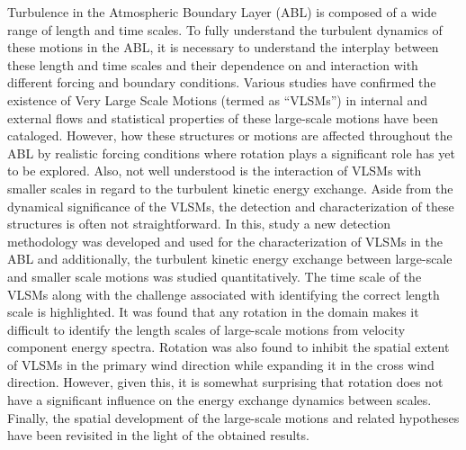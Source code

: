 
Turbulence in the Atmospheric Boundary Layer (ABL) is composed of a wide range of length
and time scales. To fully understand the turbulent dynamics of these motions in the ABL, it is
necessary to understand the interplay between these length and time scales and their
dependence on and interaction with different forcing and boundary conditions. Various studies
have confirmed the existence of Very Large Scale Motions (termed as “VLSMs”) in internal and
external flows and statistical properties of these large-scale motions have been cataloged.
However, how these structures or motions are affected throughout the ABL by realistic forcing
conditions where rotation plays a significant role has yet to be explored. Also, not well
understood is the interaction of VLSMs with smaller scales in regard to the turbulent kinetic
energy exchange. Aside from the dynamical significance of the VLSMs, the detection and
characterization of these structures is often not straightforward. In this, study a new detection
methodology was developed and used for the characterization of VLSMs in the ABL and
additionally, the turbulent kinetic energy exchange between large-scale and smaller scale
motions was studied quantitatively. The time scale of the VLSMs along with the challenge
associated with identifying the correct length scale is highlighted. It was found that any rotation
in the domain makes it difficult to identify the length scales of large-scale motions from velocity
component energy spectra. Rotation was also found to inhibit the spatial extent of VLSMs in the
primary wind direction while expanding it in the cross wind direction. However, given this, it is
somewhat surprising that rotation does not have a significant influence on the energy exchange
dynamics between scales. Finally, the spatial development of the large-scale motions and
related hypotheses have been revisited in the light of the obtained results.
